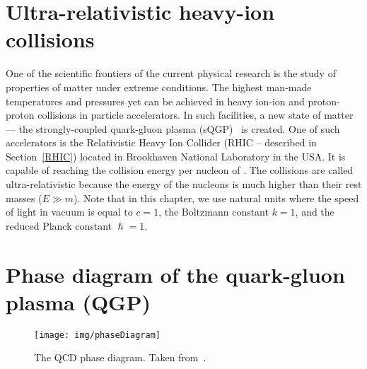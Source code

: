 
\section{Ultra-relativistic heavy-ion collisions}
One of the scientific frontiers of the current physical research is the study of properties of matter under extreme conditions. The highest man-made temperatures and pressures yet can be achieved in heavy ion-ion and proton-proton collisions in particle accelerators.
In such facilities, a new state of matter --- the strongly-coupled quark-gluon plasma (sQGP)~\cite{QGPdiscovered} is created\@. One of such accelerators is the Relativistic Heavy Ion Collider (RHIC -- described in Section~\ref{RHIC}) located in Brookhaven National Laboratory in the USA\@. It is capable of reaching the collision energy per nucleon of \snnFull\@. The collisions are called ultra-relativistic because the energy of the nucleons is much higher than their rest masses ($E \gg m$). Note that in this chapter, we use natural units where the speed of light in vacuum is equal to $c = 1$, the Boltzmann constant $k = 1$, and the reduced Planck constant $\hslash = 1$\@. 

\section{Phase diagram of the quark-gluon plasma (QGP)}

\begin{figure}[!htb]
\centering
\texttt{[image: img/phaseDiagram]}
\caption[The QCD phase diagram.]{\label{fig:phaseDiagram}The QCD phase diagram. Taken from~\cite{bnlSite}.}
\end{figure}
 

